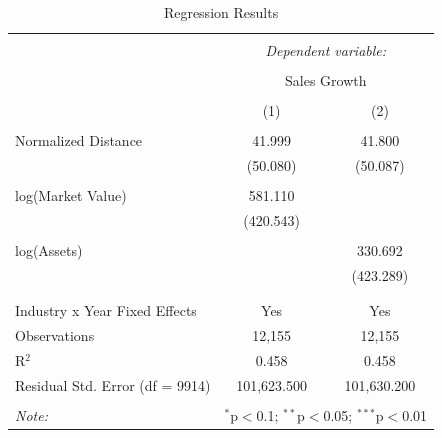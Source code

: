 \documentclass[
]{article}
\begin{document}
\begin{table}[!htbp] \centering 
  \caption{Regression Results} 
  \label{} 
\begin{tabular}{@{\extracolsep{5pt}}lcc} 
\\[-1.8ex]\hline 
\hline \\[-1.8ex] 
 & \multicolumn{2}{c}{\textit{Dependent variable:}} \\ 
\cline{2-3} 
\\[-1.8ex] & \multicolumn{2}{c}{Sales Growth} \\ 
\\[-1.8ex] & (1) & (2)\\ 
\hline \\[-1.8ex] 
 Normalized Distance & 41.999 & 41.800 \\ 
  & (50.080) & (50.087) \\ 
  & & \\ 
 log(Market Value) & 581.110 &  \\ 
  & (420.543) &  \\ 
  & & \\ 
 log(Assets) &  & 330.692 \\ 
  &  & (423.289) \\ 
  & & \\ 
\hline \\[-1.8ex] 
Industry x Year Fixed Effects & Yes & Yes \\ 
Observations & 12,155 & 12,155 \\ 
R$^{2}$ & 0.458 & 0.458 \\ 
Residual Std. Error (df = 9914) & 101,623.500 & 101,630.200 \\ 
\hline 
\hline \\[-1.8ex] 
\textit{Note:}  & \multicolumn{2}{r}{$^{*}$p$<$0.1; $^{**}$p$<$0.05; $^{***}$p$<$0.01} \\ 
\end{tabular} 
\end{table}
\end{document}
